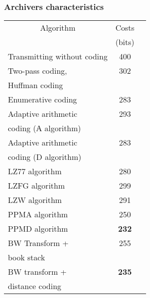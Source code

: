 \documentclass[14pt]{beamer}
\begin{document}
\begin{frame}
\frametitle{Archivers characteristics}
\begin{itemize}    


    \begin{table}[htbp]
    \begin{center}
    \scalebox{0.6} {
    \begin{tabular}
    {|l|c|c|}\hline %
    \multicolumn{1}{|c|}{Algorithm} & Costs  \\
    & (bits) \\\hline %
    Transmitting without coding & 400 \\ \hline %
    Two-pass coding,&  302 \\  %
    Huffman coding& \\ \hline %
    Enumerative coding &  283 \\ \hline %
    Adaptive arithmetic &  293 \\ %
    coding (А algorithm) &     \\ \hline %
    Adaptive arithmetic & 283 \\  %
    coding (D algorithm)&   \\ \hline %
     LZ77 algorithm&  280 \\ \hline %
     LZFG algorithm&  299 \\ \hline %
     LZW algorithm&  291 \\ \hline %
     PPMA algorithm&  250 \\ \hline %
     PPMD algorithm&   \textbf{232} \\ \hline %
     BW Transform +&  255 \\  %
     book stack & \\ \hline %
     BW transform + &  \textbf{235} \\ 
     distance coding&   \\ \hline %
    \end{tabular}
    }
    
    \end{center}
    \end{table}


\end{itemize}
\end{frame}
\end{document}
